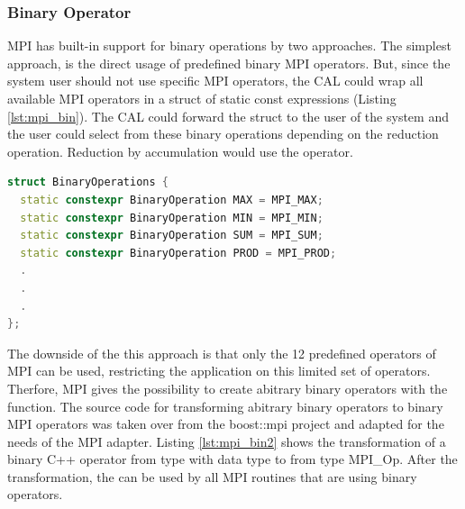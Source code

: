 
\subsubsection{Binary Operator}
\label{sec:bin_operator}

MPI has built-in support for binary operations by two approaches. The
simplest approach, is the direct usage of predefined binary MPI
operators\cite{ref:mpi_bin_op}. But, since the system user should not
use specific MPI operators, the CAL could wrap all available MPI
operators in a struct of static const expressions (Listing
\ref{lst:mpi_bin}).  The CAL could forward the struct to the user of
the system and the user could select from these binary operations
depending on the reduction operation. Reduction by accumulation would
use the  operator.


\begin{lstlisting}[language=C++, caption={A small collection of binary operators by transformed MPI operations to static constexpression }, label=lst:mpi_bin]
struct BinaryOperations { 
  static constexpr BinaryOperation MAX = MPI_MAX; 
  static constexpr BinaryOperation MIN = MPI_MIN; 
  static constexpr BinaryOperation SUM = MPI_SUM; 
  static constexpr BinaryOperation PROD = MPI_PROD; 
  .
  .
  . 
};
\end{lstlisting}


The downside of the this approach is that only the 12 predefined
operators of MPI can be used, restricting the application on this
limited set of operators. Therfore, MPI gives the possibility to
create abitrary binary operators with the 
function.  The source code for transforming abitrary binary operators
to binary MPI operators was taken over from the boost::mpi project
\cite{ref:boost_mpi} and adapted for the needs of the MPI adapter.
Listing \ref{lst:mpi_bin2} shows the transformation of a binary C++
operator  from type  with data type
 to  from type {MPI\_Op}.  After the
transformation, the  can be used by all MPI routines
that are using binary operators.


